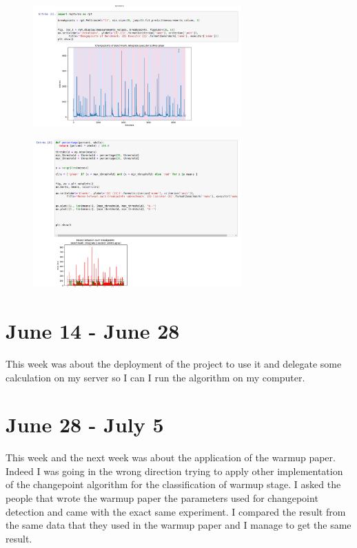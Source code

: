 \documentclass[12pt,a4paper]{article}
\begin{document}
\begin{figure}[h]
\includegraphics[width=8cm]{assets/Screenshot_20200906_111943.png}
\end{figure}


\begin{figure}[h]
\includegraphics[width=8cm]{assets/Screenshot_20200906_112000.png}
\end{figure}


\section{June 14 - June 28}
This week was about the deployment of the project to use it and delegate some calculation on my server so I can I run the algorithm on my computer.



\section{June 28 - July 5}

This week and the next week was about the application of the warmup paper. Indeed I was going in the wrong direction trying to apply other implementation of the changepoint algorithm for the classification of warmup stage. I asked the people that wrote the warmup paper the parameters used for changepoint detection and came with the exact same experiment.
I compared the result from the same data that they used in the warmup paper and I manage to get the same result.
\end{document}
